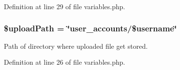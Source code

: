 Definition at line 29 of file variables.\-php.

\hypertarget{variables_8php_a9b2aca73038168dc85a3fb6d6af948a8}{
\subsubsection[{\$upload\-Path}]{\setlength{\rightskip}{0pt plus 5cm}\$upload\-Path = \char`\"{}user\-\_\-accounts/\$username\char`\"{}}}\label{variables_8php_a9b2aca73038168dc85a3fb6d6af948a8}
Path of directory where uploaded file get stored. 

Definition at line 26 of file variables.\-php.

